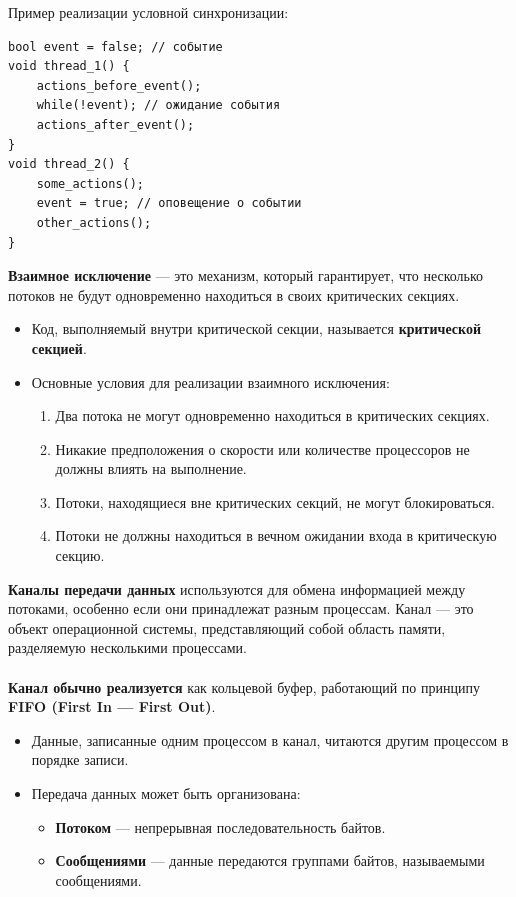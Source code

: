 \documentclass[a4paper, 12pt]{report}
\numberwithin{equation}{section}
\begin{document}
Пример реализации условной синхронизации:
\begin{verbatim}
bool event = false; // событие
void thread_1() {
    actions_before_event(); 
    while(!event); // ожидание события
    actions_after_event();
}
void thread_2() {
    some_actions(); 
    event = true; // оповещение о событии
    other_actions();
}
\end{verbatim}
\textbf{Взаимное исключение} — это механизм, который гарантирует, что несколько потоков не будут одновременно находиться в своих критических секциях. 
\begin{itemize}
    \item Код, выполняемый внутри критической секции, называется \textbf{критической секцией}.
    \item Основные условия для реализации взаимного исключения:
    \begin{enumerate}
        \item Два потока не могут одновременно находиться в критических секциях.
        \item Никакие предположения о скорости или количестве процессоров не должны влиять на выполнение.
        \item Потоки, находящиеся вне критических секций, не могут блокироваться.
        \item Потоки не должны находиться в вечном ожидании входа в критическую секцию.
    \end{enumerate}
\end{itemize}
\textbf{Каналы передачи данных} используются для обмена информацией между потоками, особенно если они принадлежат разным процессам. Канал — это объект операционной системы, представляющий собой область памяти, разделяемую несколькими процессами.
\\\\
\textbf{Канал обычно реализуется} как кольцевой буфер, работающий по принципу \textbf{FIFO (First In — First Out)}. 
\begin{itemize}
    \item Данные, записанные одним процессом в канал, читаются другим процессом в порядке записи.
    \item Передача данных может быть организована:
    \begin{itemize}
        \item \textbf{Потоком} — непрерывная последовательность байтов.
        \item \textbf{Сообщениями} — данные передаются группами байтов, называемыми сообщениями.
    \end{itemize}
\end{itemize}
\end{document}
